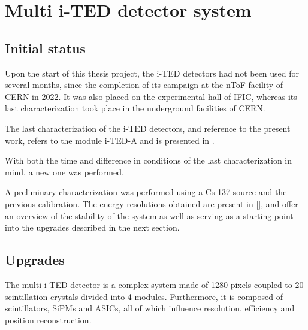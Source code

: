 \chapter{Multi i-TED detector system}\label{ch:multi-ited}

\section{Initial status}\label{sec:initial}

Upon the start of this thesis project, the \ac{i-TED} detectors had not been used for several months, since the completion of its campaign at the \ac{nToF} facility of \ac{CERN} in 2022. It was also placed on the experimental hall of \ac{IFIC}, whereas its last characterization took place in the underground facilities of \ac{CERN}.

The last characterization of the \ac{i-TED} detectors, and reference to the present work, refers to the module \ac{i-TED}-A and is presented in \cite{}.

With both the time and difference in conditions of the last characterization in mind, a new one was performed.

A preliminary characterization was performed using a Cs-137 source and the previous calibration. The energy resolutions obtained are present in \ref{}, and offer an overview of the stability of the system as well as serving as a starting point into the upgrades described in the next section.

\section{Upgrades}\label{sec:upgrades}

The multi \ac{i-TED} detector is a complex system made of 1280 pixels coupled to 20 scintillation crystals divided into 4 modules. Furthermore, it is composed of scintillators, \ac{SiPM}s and \ac{ASIC}s, all of which influence resolution, efficiency and position reconstruction.

